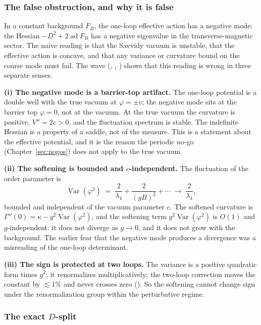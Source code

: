 \subsubsection{The false obstruction, and why it is false}

In a constant background $F_B$, the one-loop effective action has a negative mode: the Hessian
$-D^2+2\operatorname{ad}F_B$ has a negative eigenvalue in the transverse-magnetic sector. The
naive reading is that the Savvidy vacuum is unstable, that the effective action is concave, and
that any variance or curvature bound on the coarse mode must fail. The wave
(, , ) shows
that this reading is wrong in three separate senses.

\textbf{(i) The negative mode is a barrier-top artifact.} The one-loop potential is a double
well with the true vacuum at $\varphi=\pm v$; the negative mode sits at the barrier top
$\varphi=0$, not at the vacuum. At the true vacuum the curvature is positive, $V''=2c>0$, and
the fluctuation spectrum is stable. The indefinite Hessian is a property of a saddle, not of the
measure. This is a \LT{} statement about the effective potential, and it is the reason the
periodic no-go (Chapter~\ref{sec:nogos}) does not apply to the true vacuum.

\textbf{(ii) The softening is bounded and $c$-independent.} The fluctuation of the order
parameter is
\begin{equation}
\operatorname{Var}(\varphi^2)\;=\;\frac{2}{\lambda_4}+\frac{2}{(gB)^2}+\cdots
\;\longrightarrow\;\frac{2}{\lambda_4},
\label{eq:varphi2}
\end{equation}
bounded and independent of the vacuum parameter $c$. The softened curvature is
$\Gamma''(0)=\kappa-g^2\operatorname{Var}(\varphi^2)$, and the softening term $g^2
\operatorname{Var}(\varphi^2)$ is $O(1)$ and $g$-independent: it does not diverge as $g\to0$,
and it does not grow with the background. The earlier fear that the negative mode produces a
divergence was a misreading of the one-loop determinant.

\textbf{(iii) The sign is protected at two loops.} The variance is a positive quadratic form
times $g^2$; it renormalizes multiplicatively; the two-loop correction moves the constant by
$\lesssim1\%$ and never crosses zero (). So the softening cannot change
sign under the renormalization group within the perturbative regime.

\subsubsection{The exact $D$-split}

